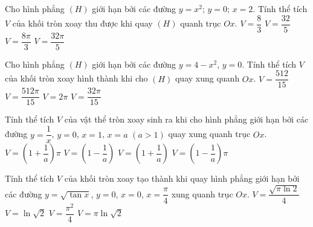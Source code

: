 	\begin{ex}%
		Cho hình phẳng $(H)$ giới hạn bởi các đường $y=x^2$; $y=0$; $x=2$. Tính thể tích $V$ của khối tròn xoay thu được khi quay $(H)$ quanh trục $Ox$. 
		\choice
		{$V=\dfrac{8}{3}$}
		{$V=\dfrac{32}{5}$}
		{$V=\dfrac{8\pi}{3}$}
		{\True $V=\dfrac{32\pi}{5}$}
	\end{ex}

	\begin{ex}%
		Cho hình phẳng $(H)$ giới hạn bởi các đường $y=4-x^2$, $y=0$. Tính thể tích $V$ của khối tròn xoay hình thành khi cho $(H)$ quay xung quanh $Ox$.
		\choice
		{$V=\dfrac{512}{15}$}
		{\True $V=\dfrac{512\pi}{15}$}
		{$V=2\pi$}
		{$V=\dfrac{32\pi}{15}$}
	\end{ex}

	\begin{ex}%
		Tính thể tích $V$ của vật thể tròn xoay sinh ra khi cho hình phẳng giới hạn bởi các đường $y=\dfrac{1}{x}$, $y=0$, $x=1$, $x=a$ $(a>1)$ quay xung quanh trục $Ox$.
		\choice
		{$V=\left(1+\dfrac{1}{a}\right)\pi$}
		{$V=\left(1-\dfrac{1}{a}\right)$}
		{$V=\left(1+\dfrac{1}{a}\right)$}
		{\True $V=\left(1-\dfrac{1}{a}\right)\pi$}
	\end{ex}

	\begin{ex}%
		Tính thể tích $V$ của khối tròn xoay tạo thành khi quay hình phẳng giới hạn bởi các đường $y=\sqrt{\tan x}$, $y=0$, $x=0$, $x=\dfrac{\pi}{4}$ xung quanh trục $Ox$. 
		\choice
		{$V=\dfrac{\sqrt{\pi\ln 2}}{4}$}
		{$V=\ln \sqrt{2}$}
		{$V=\dfrac{{\pi}^2}{4}$}
		{\True $V=\pi\ln \sqrt{2}$}
	\end{ex}

